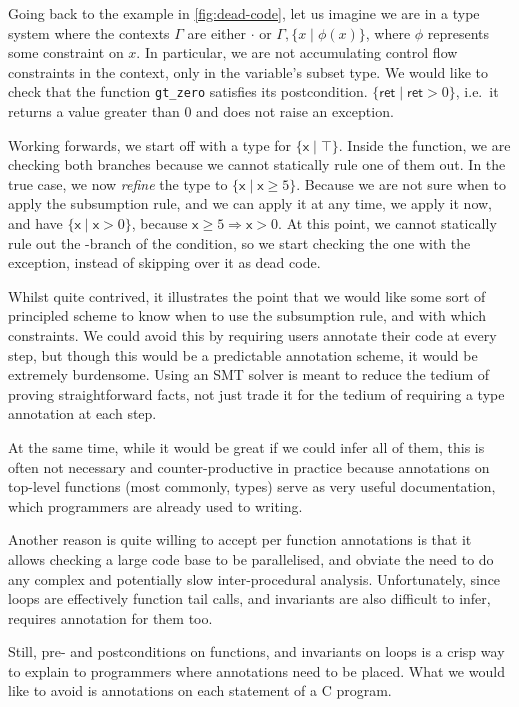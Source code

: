 Going back to the example in \cref{fig:dead-code}, let us imagine we are in a
type system where the contexts $\Gamma$ are either $\cdot$ or $\Gamma, \{ x \mid
\phi(x) \}$, where $\phi$ represents some constraint on $x$. In particular, we
are not accumulating control flow constraints in the context, only
in the variable's subset type. We would like to check that the function
\texttt{gt_zero} satisfies its postcondition. $ \{ \mathsf{ret} \mid
\mathsf{ret} > 0 \} $, i.e.\ it returns a value greater than 0 and does not
raise an exception.

Working forwards, we start off with a type for $\{ \mathsf{x} \mid \top \}$.
Inside the function, we are checking both branches because we cannot statically
rule one of them out. In the true case, we now \emph{refine} the type to $\{
\mathsf{x} \mid \mathsf{x} \geq 5 \}$. Because we are not sure when to apply
the subsumption rule, and we can apply it at any time, we apply it now, and
have $\{ \mathsf{x} \mid \mathsf{x} > 0 \}$, because $\mathsf{x} \geq 5
\Rightarrow \mathsf{x} > 0$. At this point, we cannot statically rule out the
-branch of the condition, so we start checking the one with the
exception, instead of skipping over it as dead code.

Whilst quite contrived, it illustrates the point that we would like some sort
of principled scheme to know when to use the subsumption rule, and with which
constraints. We could avoid this by requiring users annotate their code at
every step, but though this would be a predictable annotation scheme, it would
be extremely burdensome. Using an SMT solver is meant to reduce the tedium of
proving straightforward facts, not just trade it for the tedium of requiring a
type annotation at each step.

At the same time, while it would be great if we could infer all of them, this
is often not necessary and counter-productive in practice because annotations
on top-level functions (most commonly, types) serve as very useful
documentation, which programmers are already used to writing.

Another reason  is quite willing to accept per function annotations is
that it allows checking a large code base to be parallelised, and obviate the
need to do any complex and potentially slow inter-procedural analysis.
Unfortunately, since loops are effectively function tail calls, and invariants
are also difficult to infer,  requires annotation for them too.

Still, pre- and postconditions on functions, and invariants on loops is a crisp
way to explain to programmers where annotations need to be placed. What we
would like to avoid is annotations on each statement of a C program.


